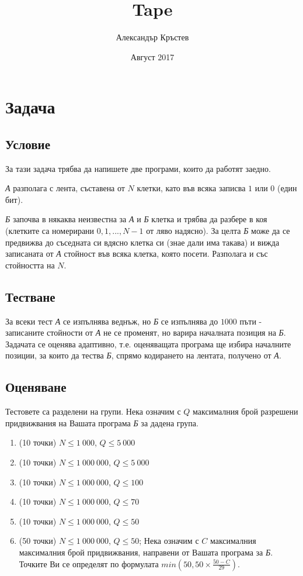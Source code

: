 \documentclass[a4paper,11pt]{article}
\title{Tape}
\author{Александър Кръстев}
\date{Август 2017}
\begin{document}
\maketitle
\section{Задача}
\subsection{Условие}
За тази задача трябва да напишете две програми, които да работят заедно.

\textit{А} разполага с лента, съставена от $N$ клетки, като във всяка записва 
$1$ или $0$ (един бит).

\textit{Б} започва в някаква неизвестна за \textit{А} и \textit{Б} клетка и 
трябва да разбере в коя 
(клетките са номерирани $0, 1,...,N-1$ от ляво надясно). 
За целта \textit{Б} може да се предвижва до съседната си вдясно клетка си 
(знае дали има такава) 
и вижда записаната от \textit{А} стойност във всяка клетка, която посети. 
Разполага и със стойността на $N$.

\subsection{Тестване}
За всеки тест \textit{А} се изпълнява веднъж, но \textit{Б} се изпълнява до
$1000$ пъти - записаните стойности от \textit{А} не се променят, но варира 
началната позиция на \textit{Б}. Задачата се оценява адаптивно, т.е. оценяващата
програма ще избира началните позиции, за които да тества \textit{Б}, спрямо 
кодирането на лентата, получено от \textit{А}.

\subsection{Оценяване}
Тестовете са разделени на групи. Нека означим с $Q$ максималния брой разрешени 
придвижвания на Вашата програма \textit{Б} за дадена група. 
\begin{enumerate}
\setlength\itemsep{0em}
 \item (10 точки) $N \leq 1\ 000$, $Q \leq 5\ 000$
 \item (10 точки) $N \leq 1\ 000\ 000$, $Q \leq 5\ 000$
 \item (10 точки) $N \leq 1\ 000\ 000$, $Q \leq 100$
 \item (10 точки) $N \leq 1\ 000\ 000$, $Q \leq 70$
 \item (10 точки) $N \leq 1\ 000\ 000$, $Q \leq 50$
 \item (50 точки) $N \leq 1\ 000\ 000$, $Q \leq 50$;
 Нека означим с $C$ максималния максималния брой придвижвания, направени от 
 Вашата програма за \textit{Б}. Точките Ви се определят по формулата
 $min(50, 50 \times \frac{50 - C}{29})$.

\end{enumerate}
\end{document}

